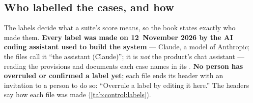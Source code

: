 \subsection{Who labelled the cases, and how}\label{sec:control:labels}

The labels decide what a suite's score means, so the book states exactly who made them.
\textbf{Every label was made on 12~November 2026 by the AI coding assistant used to build the
system} --- Claude, a model of Anthropic; the files call it \enquote{the assistant (Claude)};
it is \emph{not} the product's chat assistant --- reading the provisions and documents each
case names in its . \textbf{No person has overruled or confirmed a label yet}; each
file ends its header with an invitation to a person to do so: \enquote{Overrule a label by
editing it here.} The headers say how each file was made (\cref{tab:control:labels}).

